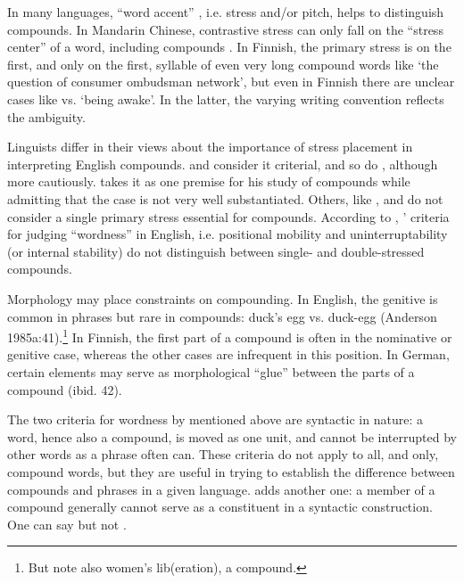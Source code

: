 In many languages, ``word accent'' \citep[204]{Lyons1968}, i.e. stress and/or pitch, helps to distinguish compounds. In Mandarin Chinese, contrastive stress can only fall on the ``stress center'' of a word, including compounds \citep[41]{Anderson1985a}. In Finnish, the primary stress is on the first, and only on the first, syllable of even very long compound words like  `the question of consumer ombudsman network', but even in Finnish there are unclear cases like  vs. \textstyleEmphasizedWords{} `being awake'. In the latter, the varying writing convention reflects the ambiguity. 

Linguists differ in their views about the importance of stress placement in interpreting English compounds. \citet[228]{Bloomfield1933} and \citet[41]{Anderson1985a} consider it criterial, and so do \citet[1330]{QuirkEtAl1989}, although more cautiously. \citet[120]{Lees1968} takes it as one premise for his study of compounds while admitting that the case is not very well substantiated. Others, like \citet[31]{Jespersen1933}, \citet{Downing1977} and \citet{Bauer1983} do not consider a single primary stress essential for compounds. According to \citet[105]{Bauer1983}, \citeauthor{Lyons1968}' \citeyear[20]{Lyons1968} criteria for judging ``wordness'' in English, i.e. positional mobility and uninterruptability (or internal stability) do not distinguish between single- and double-stressed compounds.

Morphology may place constraints on compounding. In English, the genitive is common in phrases but rare in compounds: duck's egg vs. duck-egg (Anderson{ 1985a}:41).\footnote{But note also women's lib(eration), a compound.} In Finnish, the first part of a compound is often in the nominative or genitive case, whereas the other cases are infrequent in this position. In German, certain elements may serve as morphological ``glue'' between the parts of a compound (ibid. 42).

The two criteria for wordness by \citet[202]{Lyons1968} mentioned above are syntactic in nature: a word, hence also a compound, is moved as one unit, and cannot be interrupted by other words as a phrase often can. These criteria do not apply to all, and only, compound words, but they are useful in trying to establish the difference between compounds and phrases in a given language. \citet[232]{Bloomfield1933} adds another one: a member of a compound generally cannot serve as a constituent in a syntactic construction. One can say  but not .

